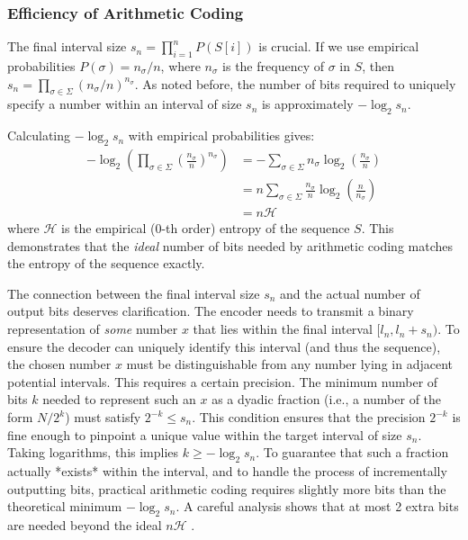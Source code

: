\subsubsection{Efficiency of Arithmetic Coding}
The final interval size $s_n = \prod_{i=1}^n P(S[i])$ is crucial. If we use empirical probabilities $P(\sigma) = n_\sigma / n$, where $n_\sigma$ is the frequency of $\sigma$ in $S$, then $s_n = \prod_{\sigma \in \Sigma} (n_\sigma / n)^{n_\sigma}$. As noted before, the number of bits required to uniquely specify a number within an interval of size $s_n$ is approximately $-\log_2 s_n$.

Calculating $-\log_2 s_n$ with empirical probabilities gives:
\begin{align*}
    -\log_2 \left( \prod_{\sigma \in \Sigma} \left(\frac{n_\sigma}{n}\right)^{n_\sigma} \right) & = -\sum_{\sigma \in \Sigma} n_\sigma \log_2 \left(\frac{n_\sigma}{n}\right)            \\
                                                                                                & = n \sum_{\sigma \in \Sigma} \frac{n_\sigma}{n} \log_2 \left(\frac{n}{n_\sigma}\right) \\
                                                                                                & = n\mathcal{H}
\end{align*}
where $\mathcal{H}$ is the empirical (0-th order) entropy of the sequence $S$. This demonstrates that the \emph{ideal} number of bits needed by arithmetic coding matches the entropy of the sequence exactly.

The connection between the final interval size $s_n$ and the actual number of output bits deserves clarification. The encoder needs to transmit a binary representation of \emph{some} number $x$ that lies within the final interval $[l_n, l_n + s_n)$. To ensure the decoder can uniquely identify this interval (and thus the sequence), the chosen number $x$ must be distinguishable from any number lying in adjacent potential intervals. This requires a certain precision. The minimum number of bits $k$ needed to represent such an $x$ as a dyadic fraction (i.e., a number of the form $N/2^k$) must satisfy $2^{-k} \le s_n$. This condition ensures that the precision $2^{-k}$ is fine enough to pinpoint a unique value within the target interval of size $s_n$. Taking logarithms, this implies $k \ge -\log_2 s_n$. To guarantee that such a fraction actually *exists* within the interval, and to handle the process of incrementally outputting bits, practical arithmetic coding requires slightly more bits than the theoretical minimum $-\log_2 s_n$. A careful analysis shows that at most 2 extra bits are needed beyond the ideal $n\mathcal{H}$ \cite{ferragina2023pearls}.


